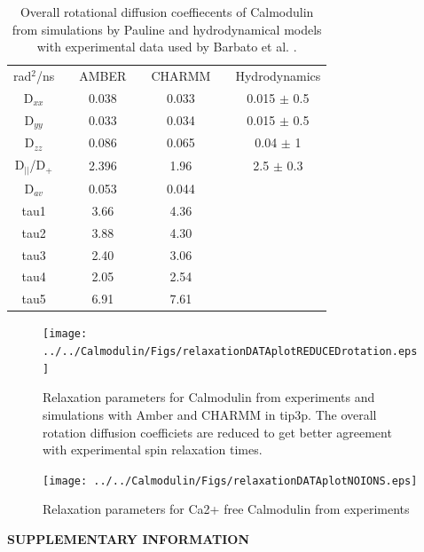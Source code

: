 \documentclass[pre,aps,floatfix,authordate1-4,twocolumn]{revtex4-1}
\begin{document}
\begin{table}[htb]
\centering
\caption{ Overall rotational diffusion coeffiecents of Calmodulin from
  simulations by Pauline and hydrodynamical models with experimental data
  used by Barbato et al. \cite{barbato92}.
}\label{ROTdiffCOEFFS}
\begin{tabular}{c c c c c c c}
rad$^2$/ns &   &  AMBER & &  CHARMM & &  Hydrodynamics \\
D$_{xx}$ &     &  0.038  & &  0.033  & & 0.015 $\pm$ 0.5\\
D$_{yy}$  &    &  0.033  & &  0.034  & & 0.015 $\pm$ 0.5\\
D$_{zz}$   &   &  0.086  & &  0.065  & & 0.04 $\pm$ 1\\
D$_||$/D$_+$ & & 2.396	& &  1.96   & & 2.5 $\pm$ 0.3\\
D$_{av}$    &  & 0.053   & &  0.044  & & \\
tau1     &    & 3.66    & &  4.36   & & \\
tau2     &    & 3.88    & &  4.30   & & \\
tau3     &    & 2.40    & &  3.06   & & \\
tau4      &   & 2.05	& &  2.54   & & \\
tau5      &   & 6.91	& &  7.61   & & \\
\end{tabular}
\end{table} 

\begin{figure}[!h]
  \texttt{[image: ../../Calmodulin/Figs/relaxationDATAplotREDUCEDrotation.eps]}%
  \caption{Relaxation parameters for Calmodulin from
    experiments and simulations with Amber and CHARMM in tip3p.
    The overall rotation diffusion coefficiets are reduced to
    get better agreement with experimental spin relaxation times.
    \label{hexPHASEdimensionsPLOT}}%
\end{figure}

\begin{figure}[!h]
  \texttt{[image: ../../Calmodulin/Figs/relaxationDATAplotNOIONS.eps]}%
  \caption{Relaxation parameters for Ca2+ free Calmodulin from
    experiments \cite{tjandra95} \label{hexPHASEdimensionsPLOT}}%
\end{figure}

\begin{acknowledgments}
\end{acknowledgments}



\newpage
\appendix
\begin{center}
{\bf SUPPLEMENTARY INFORMATION}
\end{center}


\end{document}
